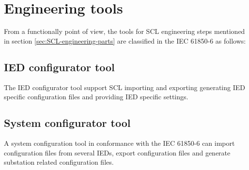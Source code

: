 \section{Engineering tools}

From a functionally point of view, 
the tools for 
SCL engineering steps 
mentioned in section \ref{sec:SCL-engineering-parts} are 
classified in the IEC 61850-6 \cite{IEC61850-6:2004} as 
follows:

\subsection{IED configurator tool}
The IED configurator tool support 
SCL importing and exporting generating IED
specific configuration files and providing IED specific settings.

\subsection{System configurator tool}
\label{sec:ch-scl--System-configurator-tool}
A system configuration tool in conformance
with the IEC 61850-6 \cite{IEC61850-6:2004} can import 
configuration files from several \glspl{IED}, 
export configuration files and generate 
substation related configuration files.


